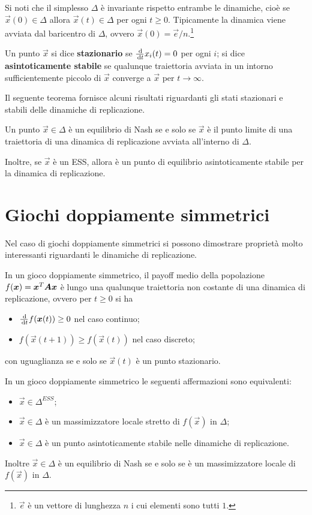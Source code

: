 Si noti che il simplesso $\Delta$ è invariante rispetto entrambe le dinamiche, cioè se $\vec{x}(0) \in \Delta$ allora $\vec{x}(t) \in \Delta$ per ogni $t \geq 0$. Tipicamente la dinamica viene avviata dal baricentro di $\Delta$, ovvero $\vec{x}(0) = \vec{e} / n$.\footnote{$\vec{e}$ è un vettore di lunghezza $n$ i cui elementi sono tutti $1$.}

Un punto $\vec{x}$ si dice \textbf{stazionario} se $\frac{\, \mathrm{d}}{\, \mathrm{d} t} x_i(t) = 0$ per ogni $i$; si dice \textbf{asintoticamente stabile} se qualunque traiettoria avviata in un intorno sufficientemente piccolo di $\vec{x}$ converge a $\vec{x}$ per $t \rightarrow \infty$.

Il seguente teorema fornisce alcuni risultati riguardanti gli stati stazionari e stabili delle dinamiche di replicazione.
\begin{thm}
	Un punto $\vec{x} \in \Delta$ è un equilibrio di Nash se e solo se $\vec{x}$ è il punto limite di una traiettoria di una dinamica di replicazione avviata all'interno di $\Delta$.
	
	Inoltre, se $\vec{x}$ è un ESS, allora è un punto di equilibrio asintoticamente stabile per la dinamica di replicazione.
\end{thm}

\section{Giochi doppiamente simmetrici}

Nel caso di giochi doppiamente simmetrici si possono dimostrare proprietà molto interessanti riguardanti le dinamiche di replicazione.
\begin{thm}
	In un gioco doppiamente simmetrico, il payoff medio della popolazione $f(\vec{x}) = \vec{x}^T \mat{A} \vec{x}$ è  lungo una qualunque traiettoria non costante di una dinamica di replicazione, ovvero per $t \geq 0$ si ha
	\begin{itemize}
		\item $\frac{\dif}{\dif t} f(\vec{x}(t)) \geq 0$ nel caso continuo;
		\item $f(\vec{x}(t + 1)) \geq f(\vec{x}(t))$ nel caso discreto;
	\end{itemize}
	con uguaglianza se e solo se $\vec{x}(t)$ è un punto stazionario.
\end{thm}
\begin{thm}
	In un gioco doppiamente simmetrico le seguenti affermazioni sono equivalenti:
	\begin{itemize}
		\item $\vec{x} \in \Delta^{ESS}$;
		\item $\vec{x} \in \Delta$ è un massimizzatore locale stretto di $f(\vec{x})$ in $\Delta$;
		\item $\vec{x} \in \Delta$ è un punto asintoticamente stabile nelle dinamiche di replicazione.
	\end{itemize}
\end{thm}
\noindent Inoltre $\vec{x} \in \Delta$ è un equilibrio di Nash se e solo se è un massimizzatore locale di $f(\vec{x})$ in $\Delta$.